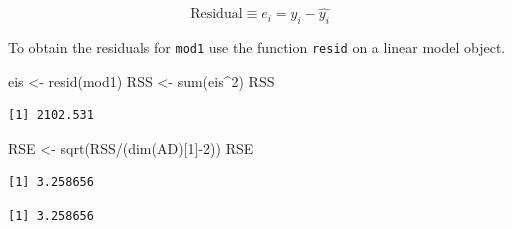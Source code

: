 \documentclass[
]{article}
\newenvironment{Shaded}{\begin{snugshade}}{\end{snugshade}}
\newcommand{\CommentTok}[1]{\textcolor[rgb]{0.56,0.35,0.01}{\textit{#1}}}
\newcommand{\DecValTok}[1]{\textcolor[rgb]{0.00,0.00,0.81}{#1}}
\newcommand{\FunctionTok}[1]{\textcolor[rgb]{0.00,0.00,0.00}{#1}}
\newcommand{\NormalTok}[1]{#1}
\newcommand{\OtherTok}[1]{\textcolor[rgb]{0.56,0.35,0.01}{#1}}
\newcommand{\SpecialCharTok}[1]{\textcolor[rgb]{0.00,0.00,0.00}{#1}}
\begin{document}
\begin{equation}
\text{Residual}\equiv e_i = y_i - \hat{y_i}
\label{eq:resid}
\end{equation}

To obtain the residuals for \texttt{mod1} use the function \texttt{resid} on a linear model object.

\begin{Shaded}
\begin{Highlighting}[]
\NormalTok{eis }\OtherTok{\textless{}{-}} \FunctionTok{resid}\NormalTok{(mod1)}
\NormalTok{RSS }\OtherTok{\textless{}{-}} \FunctionTok{sum}\NormalTok{(eis}\SpecialCharTok{\^{}}\DecValTok{2}\NormalTok{)}
\NormalTok{RSS}
\end{Highlighting}
\end{Shaded}

\begin{verbatim}
[1] 2102.531
\end{verbatim}

\begin{Shaded}
\begin{Highlighting}[]
\NormalTok{RSE }\OtherTok{\textless{}{-}} \FunctionTok{sqrt}\NormalTok{(RSS}\SpecialCharTok{/}\NormalTok{(}\FunctionTok{dim}\NormalTok{(AD)[}\DecValTok{1}\NormalTok{]}\SpecialCharTok{{-}}\DecValTok{2}\NormalTok{))}
\NormalTok{RSE}
\end{Highlighting}
\end{Shaded}

\begin{verbatim}
[1] 3.258656
\end{verbatim}

\begin{Shaded}
\end{Shaded}

\begin{verbatim}
[1] 3.258656
\end{verbatim}

\begin{Shaded}
\end{Shaded}
\end{document}
